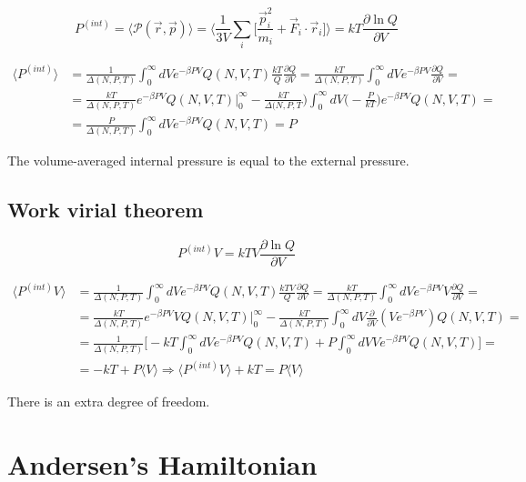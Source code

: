 	$$P^{(int)} =\langle\mathcal{P}(\vec{r}, \vec{p})\rangle = \biggl\langle\frac{1}{3V}\sum\limits_i\biggl[\frac{\vec{p}_i^2}{m_i} + \vec{F}_i\cdot\vec{r}_i\biggr]\biggr\rangle = kT\frac{\partial\ln Q}{\partial V}$$

	\begin{align*}
		\langle P^{(int)}\rangle &= \frac{1}{\Delta(N, P, T)}\int_0^{\infty}dVe^{-\beta PV}Q(N, V, T)\frac{kT}{Q}\frac{\partial Q}{\partial V} = \frac{kT}{\Delta(N, P, T)}\int_0^{\infty}dVe^{-\beta PV}\frac{\partial Q}{\partial V}=\\
														 &= \frac{kT}{\Delta(N, P, T)}e^{-\beta PV}Q(N, V, T)|_0^{\infty}-\frac{kT}{\Delta(N, P, T})\int_0^{\infty}dV\biggl(-\frac{P}{kT}\biggr)e^{-\beta PV}Q(N, V, T) = \\
														 &=\frac{P}{\Delta(N, P, T)}\int_0^{\infty}dVe^{-\beta PV}Q(N, V, T) = P
	\end{align*}

	The volume-averaged internal pressure is equal to the external pressure.

	\subsection{Work virial theorem}

	$$P^{(int)}V = kTV\frac{\partial \ln Q}{\partial V}$$

	\begin{align*}
		\langle P^{(int)}V\rangle &= \frac{1}{\Delta(N, P, T)}\int_0^{\infty}dVe^{-\beta PV}Q(N, V, T)\frac{kTV}{Q}\frac{\partial Q}{\partial V} = \frac{kT}{\Delta(N, P, T)}\int_0^{\infty}dVe^{-\beta PV}V\frac{\partial Q}{\partial V} = \\
															&=\frac{kT}{\Delta(N, P, T)}e^{-\beta PV}VQ(N, V, T)|_{0}^{\infty}-\frac{kT}{\Delta(N, P, T)}\int_0^{\infty}dV\frac{\partial}{\partial V}(Ve^{-\beta PV})Q(N, V, T)=\\
															&= \frac{1}{\Delta(N, P, T)}\biggl[-kT\int_0^{\infty}dVe^{-\beta PV}Q(N, V, T) + P\int_0^{\infty}dVVe^{-\beta PV}Q(N, V, T)\biggr]=\\
															&=-kT+P\langle V\rangle \Rightarrow \langle P^{(int)}V\rangle + kT = P\langle V\rangle
	\end{align*}

	There is an extra degree of freedom.

\section{Andersen's Hamiltonian}

